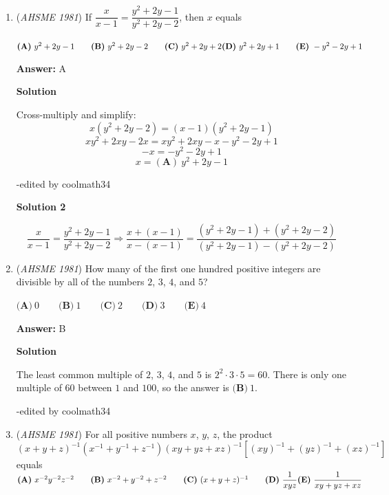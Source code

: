 \begin{enumerate}
 -edited by coolmath34, j314andrews

 


	\item (\textit{AHSME 1981}) If $\dfrac{x}{x-1}=\dfrac{y^2+2y-1}{y^2+2y-2}$, then $x$ equals 


 $\textbf{(A)}\ y^2+2y-1\qquad\textbf{(B)}\ y^2+2y-2\qquad\textbf{(C)}\ y^2+2y+2 \qquad \\ \textbf{(D)}\ y^2+2y+1\qquad\textbf{(E)}\ -y^2-2y+1$

 \textbf{Answer: }A



\textbf{Solution}

Cross-multiply and simplify:
 \[x(y^2 + 2y - 2) = (x-1)(y^2 + 2y - 1)\]
 \[xy^2 + 2xy - 2x = xy^2 + 2xy - x - y^2 - 2y + 1\]
 \[-x = -y^2 - 2y + 1\]
 \[x = \boxed{(\textbf{A})\ y^2 + 2y - 1}\]

 -edited by coolmath34

 


 


 



\textbf{Solution 2}


 \[\frac{x}{x-1} = \frac{y^2+2y-1}{y^2+2y-2} \Rightarrow \frac{x+(x-1)}{x-(x-1)} = \frac{(y^2+2y-1)+(y^2+2y-2)}{(y^2+2y-1)-(y^2+2y-2)}\]



	\item (\textit{AHSME 1981}) How many of the first one hundred positive integers are divisible by all of the numbers $2$, $3$, $4$, and $5$?


 $\textbf{(A)}\ 0\qquad\textbf{(B)}\ 1\qquad\textbf{(C)}\ 2\qquad\textbf{(D)}\ 3\qquad\textbf{(E)}\ 4$

 \textbf{Answer: }B



\textbf{Solution}

The least common multiple of $2$, $3$, $4$, and $5$ is $2^2 \cdot 3 \cdot 5 = 60$. There is only one multiple of $60$ between $1$ and $100$, so the answer is $\boxed{\textbf{(B)}\ 1}$.

 -edited by coolmath34

 


	\item (\textit{AHSME 1981}) For all positive numbers $x$, $y$, $z$, the product $(x+y+z)^{-1}(x^{-1}+y^{-1}+z^{-1})(xy+yz+xz)^{-1}[(xy)^{-1}+(yz)^{-1}+(xz)^{-1}]$ equals $\textbf{(A)}\ x^{-2}y^{-2}z^{-2}\qquad\textbf{(B)}\ x^{-2}+y^{-2}+z^{-2}\qquad\textbf{(C)}\ (x+y+z)^{-1}\qquad \textbf{(D)}\ \dfrac{1}{xyz}\qquad \\ \textbf{(E)}\ \dfrac{1}{xy+yz+xz}$


\end{enumerate}
